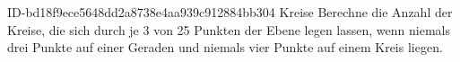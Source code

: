 \begin{exercise}
      {ID-bd18f9ece5648dd2a8738e4aa939c912884bb304}
      {Kreise}
  \ifproblem\problem
    Berechne die Anzahl der Kreise, die sich durch je 3 von 25 Punkten der
    Ebene legen lassen, wenn niemals drei Punkte auf einer Geraden und
    niemals vier Punkte auf einem Kreis liegen.
  \fi
\end{exercise}
